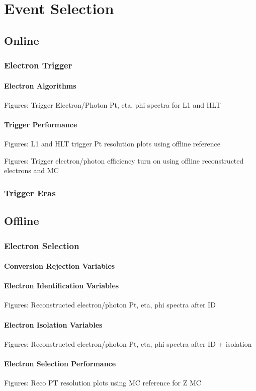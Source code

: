 \documentclass [11pt, twoside] {uwthesis}
\begin{document}
\chapter{Event Selection}
\section{Online}
\subsection{Electron Trigger}
\subsubsection{Electron Algorithms}
Figures: Trigger Electron/Photon Pt, eta, phi spectra for L1 and HLT
\subsubsection{Trigger Performance}
Figures: L1 and HLT trigger Pt resolution plots using offline reference

Figures: Trigger electron/photon efficiency turn on using offline reconstructed electrons and MC
\subsection{Trigger Eras}
\section{Offline}
\subsection{Electron Selection}
\subsubsection{Conversion Rejection Variables}
\subsubsection{Electron Identification Variables}
Figures: Reconstructed electron/photon Pt, eta, phi spectra after ID
\subsubsection{Electron Isolation Variables}
Figures: Reconstructed electron/photon Pt, eta, phi spectra after ID + isolation
\subsubsection{Electron Selection Performance}
Figures: Reco PT resolution plots using MC reference for Z MC
\end{document}
